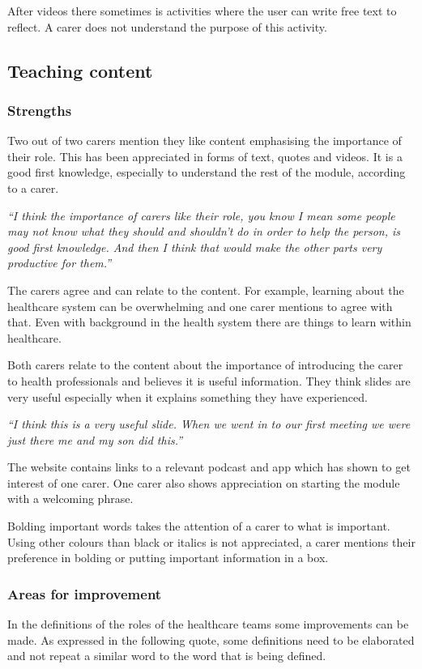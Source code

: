 \documentclass{sigchi}
\begin{document}
After videos there sometimes is activities where the user can write free text to reflect. A carer does not understand the purpose of this activity. 

\subsection{Teaching content}
\subsubsection{Strengths}
Two out of two carers mention they like content emphasising the importance of their role. This has been appreciated in forms of text, quotes and videos. It is a good first knowledge, especially to understand the rest of the module, according to a carer.

\textit{“I think the importance of carers like their role, you know I mean some people may not know what they should and shouldn't do in order to help the person, is good first knowledge. And then I think that would make the other parts very productive for them.”}

The carers agree and can relate to the content. For example, learning about the healthcare system can be overwhelming and one carer mentions to agree with that. Even with background in the health system there are things to learn within healthcare.

Both carers relate to the content about the importance of introducing the carer to health professionals and believes it is useful information. They think slides are very useful especially when it explains something they have experienced.

\textit{“I think this is a very useful slide. When we went in to our first meeting we were just there me and my son did this.”}

The website contains links to a relevant podcast and app which has shown to get interest of one carer. One carer also shows appreciation on starting the module with a welcoming phrase.

Bolding important words takes the attention of a carer to what is important. Using other colours than black or italics is not appreciated, a carer mentions their preference in bolding or putting important information in a box.

\subsubsection{Areas for improvement}
In the definitions of the roles of the healthcare teams some improvements can be made. As expressed in the following quote, some definitions need to be elaborated and not repeat a similar word to the word that is being defined.
\end{document}

